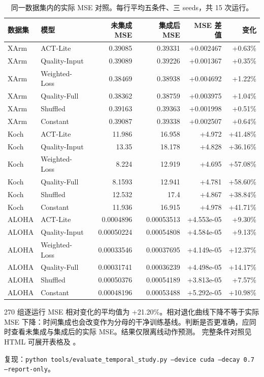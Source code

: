 \documentclass[11pt,a4paper]{ctexart}
\newcommand{\code}[1]{\texttt{\small #1}}
\begin{document}
\begin{table}[H]\centering\small\begin{tabularx}{\linewidth}{lYrrrr}\toprule
数据集 & 模型 & 未集成 MSE & 集成后 MSE & MSE 差值 & 变化\\\midrule
XArm & ACT-Lite & 0.39085 & 0.39331 & +0.002467 & +0.63\%\\
XArm & Quality-Input & 0.39089 & 0.39226 & +0.001367 & +0.35\%\\
XArm & Weighted-Loss & 0.38469 & 0.38938 & +0.004692 & +1.22\%\\
XArm & Quality-Full & 0.38362 & 0.38759 & +0.003975 & +1.04\%\\
XArm & Shuffled & 0.39163 & 0.39363 & +0.001998 & +0.51\%\\
XArm & Constant & 0.39087 & 0.39338 & +0.002507 & +0.64\%\\
Koch & ACT-Lite & 11.986 & 16.958 & +4.972 & +41.48\%\\
Koch & Quality-Input & 13.35 & 18.178 & +4.828 & +36.16\%\\
Koch & Weighted-Loss & 8.224 & 12.919 & +4.695 & +57.08\%\\
Koch & Quality-Full & 8.1593 & 12.941 & +4.781 & +58.60\%\\
Koch & Shuffled & 12.532 & 17.4 & +4.867 & +38.84\%\\
Koch & Constant & 11.936 & 16.915 & +4.978 & +41.71\%\\
ALOHA & ACT-Lite & 0.0004896 & 0.00053513 & +4.553e-05 & +9.30\%\\
ALOHA & Quality-Input & 0.00050224 & 0.00054808 & +4.584e-05 & +9.13\%\\
ALOHA & Weighted-Loss & 0.00033546 & 0.00037695 & +4.149e-05 & +12.37\%\\
ALOHA & Quality-Full & 0.00031741 & 0.00036239 & +4.498e-05 & +14.17\%\\
ALOHA & Shuffled & 0.00050376 & 0.00054189 & +3.813e-05 & +7.57\%\\
ALOHA & Constant & 0.00048196 & 0.00053488 & +5.292e-05 & +10.98\%\\
\bottomrule\end{tabularx}\caption{同一数据集内的实际 MSE 对照。每行平均五条件、三 seeds，共 15 次运行。}\end{table}
270 组逐运行 MSE 相对变化的平均值为 +21.20\%。相对退化曲线下降不等于实际 MSE 下降：时间集成也会改变作为分母的干净训练基线。判断是否更准确，应同时查看未集成与集成后的实际 MSE。结果仅限离线动作预测。
\noindent 完整条件对照见 HTML 可展开表格及 。
\par\noindent 复现：\code{python tools/evaluate\_temporal\_study.py --device cuda --decay 0.7 --report-only}。
\par\endgroup
\clearpage
\end{document}
